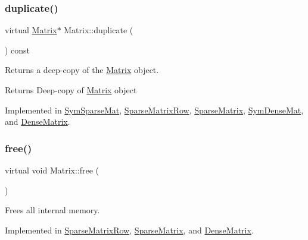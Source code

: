 \subsubsection{\texorpdfstring{duplicate()}{duplicate()}}
{\footnotesize\ttfamily virtual \hyperlink{class_matrix}{Matrix}$\ast$ Matrix\+::duplicate (\begin{DoxyParamCaption}{ }\end{DoxyParamCaption}) const\hspace{0.3cm}{\ttfamily [pure virtual]}}

Returns a deep-\/copy of the \hyperlink{class_matrix}{Matrix} object. \begin{DoxyReturn}{Returns}
Deep-\/copy of \hyperlink{class_matrix}{Matrix} object 
\end{DoxyReturn}


Implemented in \hyperlink{class_sym_sparse_mat_a3538621d1eadb47a97e7299cf87c0e66}{Sym\+Sparse\+Mat}, \hyperlink{class_sparse_matrix_row_a2a74a4b97da1de2e8bd59ddd342afbba}{Sparse\+Matrix\+Row}, \hyperlink{class_sparse_matrix_a6bc56359292e4a3e97ecbca4c8f3d3c6}{Sparse\+Matrix}, \hyperlink{class_sym_dense_mat_a432a0e30f0440983d32d225759ac9936}{Sym\+Dense\+Mat}, and \hyperlink{class_dense_matrix_ac3f9cdc908b1f74c1dac8c14d0a09e7e}{Dense\+Matrix}.

\mbox{\label{class_matrix_ae13ca77389c2eae7b3eba79cb9fefecb}} 
\subsubsection{\texorpdfstring{free()}{free()}}
{\footnotesize\ttfamily virtual void Matrix\+::free (\begin{DoxyParamCaption}{ }\end{DoxyParamCaption})\hspace{0.3cm}{\ttfamily [pure virtual]}}

Frees all internal memory. 

Implemented in \hyperlink{class_sparse_matrix_row_a5295955ae17b29db89b8fc2607bab8c8}{Sparse\+Matrix\+Row}, \hyperlink{class_sparse_matrix_a79d5aeb24f1b1184b9fb798144999ea2}{Sparse\+Matrix}, and \hyperlink{class_dense_matrix_acce63266bde8d6fd4a6c31a78c5e49e8}{Dense\+Matrix}.

\mbox{\label{class_matrix_ac53a5bbb05c6a928af17e0d88220ff63}} 
